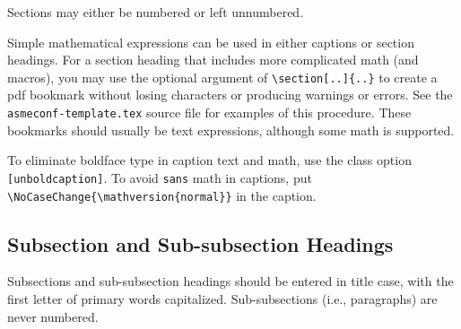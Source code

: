 \documentclass[captionpatch,colorlinks,upint,subscriptcorrection,varvw,german]{asmeconf}
\begin{document}
Sections may either be numbered or left unnumbered.

Simple mathematical expressions can be used in either captions or section headings. For a section heading that includes more complicated math (and macros), you may use the optional argument of \verb|\section[..]{..}| to create a pdf bookmark without losing characters or producing warnings or errors. See the \texttt{asmeconf-template.tex} source file for examples of this procedure. These bookmarks should usually be text expressions, although some math is supported.  

To eliminate boldface type in caption text and math, use the class option \texttt{[unboldcaption]}.  To avoid \texttt{sans} math in captions, put \verb|\NoCaseChange{\mathversion{normal}}| in the caption.

\subsection{Subsection and Sub-subsection Headings}

Subsections and sub-subsection headings should be entered in title case, with the first letter of primary words capitalized. Sub-subsections (i.e., paragraphs) are never numbered.




\begin{table}[t]
\caption[Table]{A simple table}\label{tab:1}
\end{table}


\end{document}
